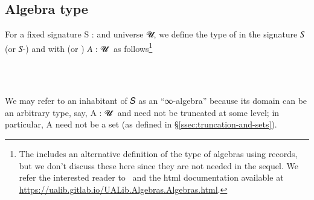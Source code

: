 \documentclass[a4paper,UKenglish,cleveref,autoref,thm-restate]{lipics-v2021}
\begin{document}
\subsection{Algebra type}\label{ssec:algebra-type}
For a fixed signature \ab S \as : \sigOV and universe \ab 𝓤, we define the type of  in the signature \ab 𝑆 (or \ab 𝑆-) and with  (or ) \ab 𝐴 \as : \ab 𝓤 \as ̇ as follows\footnote{The \agdaualib includes an alternative definition of the type of algebras using records, but we don't discuss these here since they are not needed in the sequel. We refer the interested reader to~\cite{DeMeo:2021} and the html documentation available at \url{https://ualib.gitlab.io/UALib.Algebras.Algebras.html}.}
\ccpad
\begin{code}%
\>[0]\AgdaSpace{}%
\AgdaSymbol{:}\AgdaSpace{}%
\AgdaSymbol{(}\AgdaSpace{}%
\AgdaSymbol{:}\AgdaSpace{}%
\AgdaSymbol{)(}\AgdaSpace{}%
\AgdaSymbol{:}\AgdaSpace{}%
\AgdaSpace{}%
\AgdaSpace{}%
\AgdaSymbol{)}\AgdaSpace{}%
%
\>[50]\AgdaSpace{}%
\AgdaSpace{}%
\AgdaSpace{}%
\AgdaSpace{}%
\AgdaSpace{}%
\AgdaSpace{}%
\<%
\\
%
\\[\AgdaEmptyExtraSkip]%
\>[0]\AgdaSpace{}%
%
\>[13]\AgdaSpace{}%
\AgdaSymbol{=}\AgdaSpace{}%
\AgdaSpace{}%
\AgdaSpace{}%
\AgdaSpace{}%
\AgdaSpace{}%
\AgdaSpace{}%
\AgdaFunction{,}\AgdaSpace{}%
\AgdaSymbol{((}\AgdaSpace{}%
\AgdaSymbol{:}\AgdaSpace{}%
\AgdaSpace{}%
\AgdaSpace{}%
\AgdaSymbol{)}\AgdaSpace{}%
\AgdaSpace{}%
\AgdaSpace{}%
\AgdaSymbol{(}\AgdaSpace{}%
\AgdaSpace{}%
\AgdaSpace{}%
\AgdaSymbol{)}\AgdaSpace{}%
\AgdaSymbol{)}\<%
\end{code}
\ccpad
We may refer to an inhabitant of  \ab 𝑆  as an ``∞-algebra'' because its domain can be an arbitrary type, say, \ab A \as : \ab 𝓤 \af ̇ and need not be truncated at some level; in particular, \ab A need not be a set (as defined in \S\ref{ssec:truncation-and-sets}).
\end{document}
